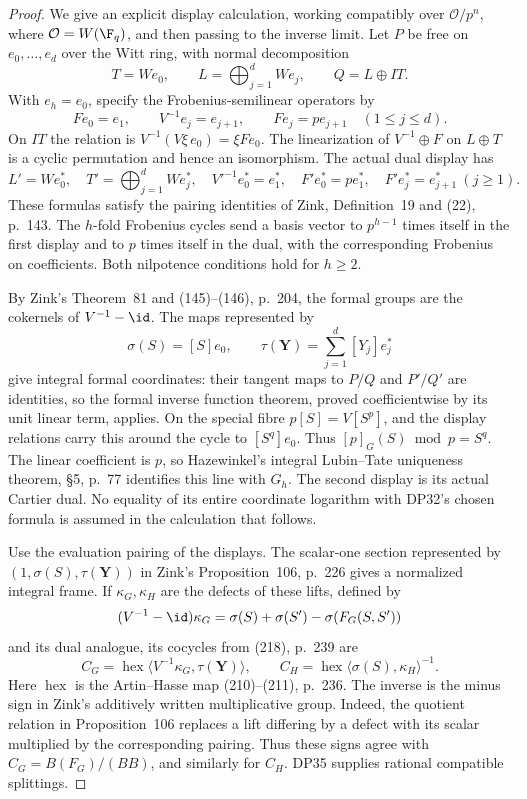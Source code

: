 \begin{proof}
We give an explicit display calculation, working compatibly over $\mathcal O/p^n$, where $\mathcal O=W(\F_q)$, and then passing to the inverse limit. Let $P$ be free on $e_0,\ldots,e_d$ over the Witt ring, with normal decomposition
\[
 T=We_0,\qquad L=\bigoplus_{j=1}^dWe_j,\qquad Q=L\oplus IT.
\]
With $e_h=e_0$, specify the Frobenius-semilinear operators by
\[
 Fe_0=e_1,\qquad V^{-1}e_j=e_{j+1},\qquad Fe_j=pe_{j+1}\quad(1\le j\le d).
\]
On $IT$ the relation is $V^{-1}(V\xi\,e_0)=\xi Fe_0$. The linearization of $V^{-1}\oplus F$ on $L\oplus T$ is a cyclic permutation and hence an isomorphism. The actual dual display has
\[
 L'=We_0^*,\quad T'=\bigoplus_{j=1}^dWe_j^*,\quad
 V'^{-1}e_0^*=e_1^*,\quad F'e_0^*=pe_1^*,\quad
 F'e_j^*=e_{j+1}^*\ (j\ge1).
\]
These formulas satisfy the pairing identities of Zink, Definition~19 and (22), p.~143. The $h$-fold Frobenius cycles send a basis vector to $p^{h-1}$ times itself in the first display and to $p$ times itself in the dual, with the corresponding Frobenius on coefficients. Both nilpotence conditions hold for $h\ge2$.

By Zink's Theorem~81 and (145)--(146), p.~204, the formal groups are the cokernels of $V^{-1}-\id$. The maps represented by
\[
 \sigma(S)=[S]e_0,\qquad \tau(\mathbf Y)=\sum_{j=1}^d[Y_j]e_j^*
\]
give integral formal coordinates: their tangent maps to $P/Q$ and $P'/Q'$ are identities, so the formal inverse function theorem, proved coefficientwise by its unit linear term, applies. On the special fibre $p[S]=V[S^p]$, and the display relations carry this around the cycle to $[S^q]e_0$. Thus $[p]_G(S)\bmod p=S^q$. The linear coefficient is $p$, so Hazewinkel's integral Lubin--Tate uniqueness theorem, \S5, p.~77 identifies this line with $G_h$. The second display is its actual Cartier dual. No equality of its entire coordinate logarithm with DP32's chosen formula is assumed in the calculation that follows.

Use the evaluation pairing of the displays. The scalar-one section represented by $(1,\sigma(S),\tau(\mathbf Y))$ in Zink's Proposition~106, p.~226 gives a normalized integral frame. If $\kappa_G,\kappa_H$ are the defects of these lifts, defined by
\[
 (V^{-1}-\id)\kappa_G=\sigma(S)+\sigma(S')-\sigma(F_G(S,S'))
\]
and its dual analogue, its cocycles from (218), p.~239 are
\begin{equation}\label{eq:display-cocycles}
 C_G=\operatorname{hex}\langle V^{-1}\kappa_G,\tau(\mathbf Y)\rangle,
 \qquad C_H=\operatorname{hex}\langle\sigma(S),\kappa_H\rangle^{-1}.
\end{equation}
Here $\operatorname{hex}$ is the Artin--Hasse map (210)--(211), p.~236. The inverse is the minus sign in Zink's additively written multiplicative group. Indeed, the quotient relation in Proposition~106 replaces a lift differing by a defect with its scalar multiplied by the corresponding pairing. Thus these signs agree with $C_G=B(F_G)/(BB)$, and similarly for $C_H$. DP35 supplies rational compatible splittings.


\end{proof}
